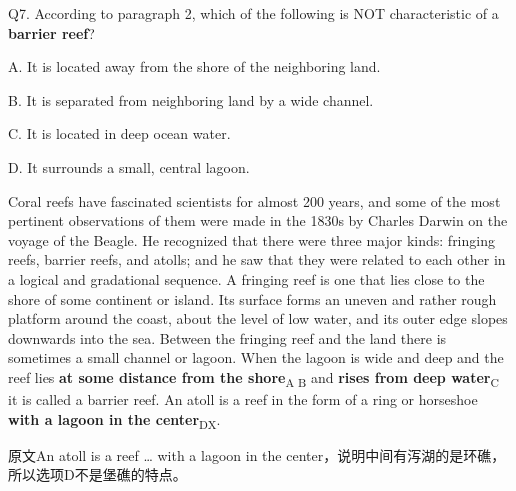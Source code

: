 \begin{blk}
    \begin{qst}
        Q7. According to paragraph 2, which of the following is NOT characteristic of a \textbf{barrier reef}?
    \end{qst}

    \begin{chc}
        A. It is located away from the shore of the neighboring land.

        B. It is separated from neighboring land by a wide channel.

        C. It is located in deep ocean water.

        D. It surrounds a small, central lagoon.
    \end{chc}

    \begin{psgq}
        Coral reefs have fascinated scientists for almost 200 years, and some of the most pertinent observations of them were made in the 1830s by Charles Darwin on the voyage of the Beagle. He recognized that there were three major kinds: fringing reefs, barrier reefs, and atolls; and he saw that they were related to each other in a logical and gradational sequence. A fringing reef is one that lies close to the shore of some continent or island. Its surface forms an uneven and rather rough platform around the coast, about the level of low water, and its outer edge slopes downwards into the sea. Between the fringing reef and the land there is sometimes a small channel or lagoon. When the lagoon is wide and deep and the reef lies \textbf{at some distance from the shore}\textsubscript{A B} and \textbf{rises from deep water}\textsubscript{C} it is called a barrier reef. An atoll is a reef in the form of a ring or horseshoe \textbf{with a lagoon in the center}\textsubscript{DX}.
    \end{psgq}

    \begin{nlz}
        原文An atoll is a reef … with a lagoon in the center，说明中间有泻湖的是环礁，所以选项D不是堡礁的特点。
    \end{nlz}
\end{blk}

